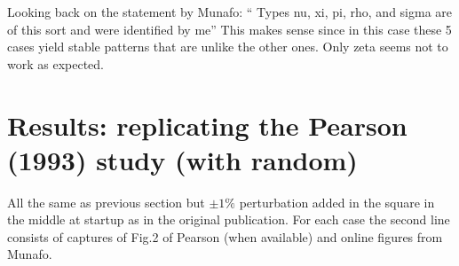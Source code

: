 Looking back on the statement by Munafo: ``
Types nu, xi, pi, rho, and sigma are of this sort and were identified by me''
This makes sense since in this case these 5 cases yield stable patterns 
that are unlike the other ones.
Only zeta seems not to work as expected.


\newpage
\section*{Results: replicating the Pearson (1993) study (with random)}

All the same as previous section but $\pm 1\%$ perturbation added in the square 
in the middle at startup as in the original publication.
For each case the second line consists of captures of Fig.2 of Pearson (when available) and online figures from Munafo.

